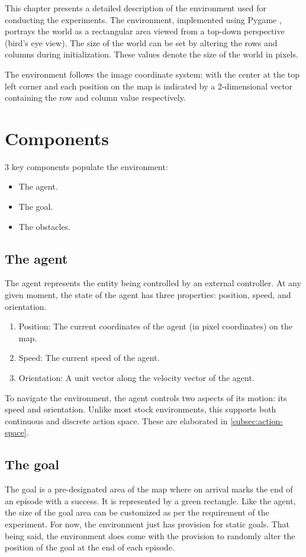 \label{ch:enviornment}
This chapter presents a detailed description of the environment used for conducting the experiments. The environment, implemented using Pygame \cite{pygame}, portrays the world as a rectangular area viewed from a top-down perspective (bird's eye view). 
The size of the world can be set by altering the rows and columns during initialization. These values denote the size of the world in pixels.

The environment follows the image coordinate system: with the center at the top left corner and each position on the map is indicated by a 2-dimensional vector containing the row and column value respectively.\\
\section{Components}
3 key components populate the environment: 
\begin{itemize}
    \item The agent.
    \item The goal.
    \item The obstacles.
\end{itemize}
\subsection{The agent}
The agent represents the entity being controlled by an external controller. At any given moment, the state of the agent has three properties: position, speed, and orientation.
\begin{enumerate}
    \item Position: The current coordinates of the agent (in pixel coordinates) on the map.
    \item Speed: The current speed of the agent.
    \item Orientation: A unit vector along the velocity vector of the agent.
\end{enumerate}
To navigate the environment, the agent controls two aspects of its motion: its speed and orientation.
Unlike most stock environments, this supports both continuous and discrete action space. These are elaborated in \autoref{subsec:action-space}.
\subsection{The goal}
The goal is a pre-designated area of the map where on arrival marks the end of an episode with a success. It is represented by a green rectangle. Like the agent, the size of the goal area can be customized as per the requirement of the experiment. For now, the environment just has provision for static goals. That being said, the environment does come with the provision to randomly alter the position of the goal at the end of each episode.


